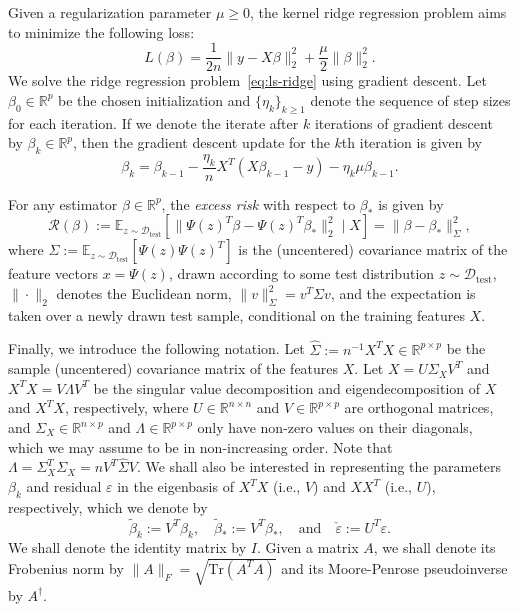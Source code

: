\documentclass[11pt]{article}
\begin{document}
Given a regularization parameter $\mu \geq 0$, the kernel ridge regression problem aims to minimize the following loss:
\begin{equation} \label{eq:ls-ridge}
    L(\beta) = \frac{1}{2n}\|y - X\beta\|_2^2 + \frac{\mu}{2}\|\beta\|^2_2.
\end{equation}
We solve the ridge regression problem~\eqref{eq:ls-ridge} using gradient descent. Let $\beta_0 \in \mathbb{R}^p$ be the chosen initialization and $\{ \eta_k \}_{k \geq 1}$ denote the sequence of step sizes for each iteration. If we denote the iterate after $k$ iterations of gradient descent by $\beta_k \in \mathbb{R}^p$, then the gradient descent update for the $k$th iteration is given by
\begin{equation} \label{eq:update}
    \beta_{k} = \beta_{k-1} - \frac{\eta_{k}}{n} X^T(X\beta_{k-1} - y) - \eta_{k}\mu \beta_{k-1}.
\end{equation}

For any estimator $\beta \in \mathbb{R}^p$, the \emph{excess risk} with respect to $\beta_*$ is given by
\begin{equation} \label{eq:excess_risk}
    \mathcal{R}(\beta)
    := \mathbb{E}_{z \sim \mathcal{D}_{\mathrm{test}}}\left[\|\Psi(z)^T\beta - \Psi(z)^T\beta_*\|^2_2 \mid X \right]
    = \|\beta - \beta_*\|^2_\Sigma,
\end{equation}
where $\Sigma := \mathbb{E}_{z \sim \mathcal{D}_{\mathrm{test}}}[\Psi(z) \Psi(z)^T]$ is the (uncentered) covariance matrix of the feature vectors $x = \Psi(z)$, drawn according to some test distribution $z \sim \mathcal{D}_{\mathrm{test}}$, $\|\cdot\|_2$ denotes the Euclidean norm, $\|v\|_\Sigma^2 = v^T\Sigma v$, and the expectation is taken over a newly drawn test sample, conditional on the training features $X$.

Finally, we introduce the following notation. Let $\hat{\Sigma} := n^{-1} X^T X \in \mathbb{R}^{p \times p}$ be the sample (uncentered) covariance matrix of the features $X$.
Let $X = U\Sigma_X V^T$ and $X^TX = V \Lambda V^T$ be the singular value decomposition and eigendecomposition of $X$ and $X^T X$, respectively, where $U \in \mathbb{R}^{n \times n}$ and $V \in \mathbb{R}^{p \times p}$ are orthogonal matrices, and $\Sigma_X \in \mathbb{R}^{n \times p}$ and $\Lambda \in \mathbb{R}^{p \times p}$ only have non-zero values on their diagonals, which we may assume to be in non-increasing order. Note that $\Lambda = \Sigma_X^T \Sigma_X = n V^T \hat{\Sigma} V$.
We shall also be interested in representing the parameters $\beta_k$ and residual $\varepsilon$ in the eigenbasis of $X^T X$ (i.e., $V$) and $XX^T$ (i.e., $U$), respectively, which we denote by
\begin{equation} \label{eq:in-eigbasis}
    \tilde{\beta}_k := V^T\beta_k, \quad \tilde{\beta}_* := V^T\beta_*, \quad \text{and} \quad \check{\varepsilon} := U^T \varepsilon.
\end{equation}
We shall denote the identity matrix by $I$. Given a matrix $A$, we shall denote its Frobenius norm by $\|A\|_F = \sqrt{\mathrm{Tr}(A^T A)}$ and its Moore-Penrose pseudoinverse by $A^{\dagger}$.
\end{document}
